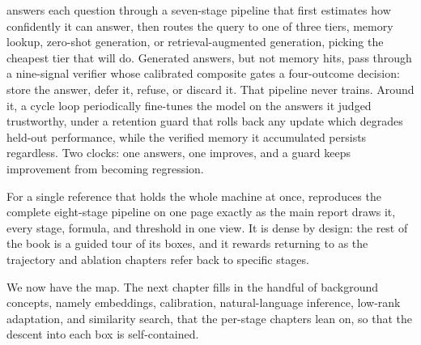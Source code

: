\begin{defence}
\caem{} answers each question through a seven-stage pipeline that first estimates
how confidently it can answer, then routes the query to one of three tiers,
memory lookup, zero-shot generation, or retrieval-augmented generation, picking
the cheapest tier that will do. Generated answers, but not memory hits, pass
through a nine-signal verifier whose calibrated composite gates a four-outcome
decision: store the answer, defer it, refuse, or discard it. That pipeline never
trains. Around it, a cycle loop periodically fine-tunes the model on the answers
it judged trustworthy, under a retention guard that rolls back any update which
degrades held-out performance, while the verified memory it accumulated persists
regardless. Two clocks: one answers, one improves, and a guard keeps improvement
from becoming regression.
\end{defence}

For a single reference that holds the whole machine at once, 
reproduces the complete eight-stage pipeline on one page exactly as the main report
draws it, every stage, formula, and threshold in one view. It is dense by design: the
rest of the book is a guided tour of its boxes, and it rewards returning to as the
trajectory and ablation chapters refer back to specific stages.



We now have the map. The next chapter fills in the handful of background concepts,
namely embeddings, calibration, natural-language inference, low-rank adaptation,
and similarity search, that the per-stage chapters lean on, so that the descent
into each box is self-contained.
